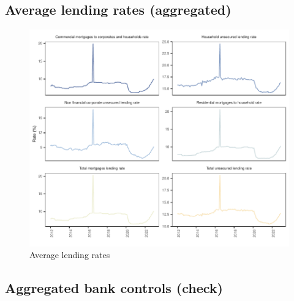 \documentclass[
  letterpaper,
  DIV=11,
  numbers=noendperiod]{scrartcl}
\begin{document}
\newpage

\hypertarget{average-lending-rates-aggregated}{%
\subsection{Average lending rates
(aggregated)}\label{average-lending-rates-aggregated}}

\begin{figure}[H]

{\centering \includegraphics{UP_paper_files/figure-pdf/fig-bank_interest_rates-1.pdf}

}

\caption{\label{fig-bank_interest_rates}Average lending rates}

\end{figure}

\hypertarget{aggregated-bank-controls-check}{%
\subsection{Aggregated bank controls
(check)}\label{aggregated-bank-controls-check}}
\end{document}
